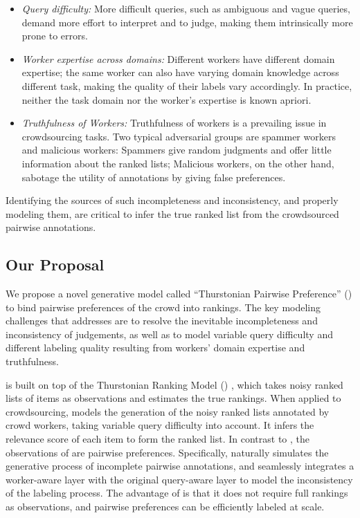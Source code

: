 \begin{itemize}
  \item \emph{Query difficulty:}  More difficult queries, such as ambiguous and
    vague queries, demand more effort to interpret and to judge, making them
    intrinsically more prone to errors.
  \item  {\emph{Worker expertise across domains:}} Different workers have
    different domain expertise; the same worker can also have varying domain
    knowledge across different task, making the quality of their labels vary
    accordingly. In practice, neither the task domain nor the worker's expertise
    is known apriori.
  \item {\emph{Truthfulness of Workers:}} Truthfulness of workers is a prevailing
    issue in crowdsourcing tasks. Two typical adversarial groups are spammer
    workers and malicious workers: Spammers give random judgments and offer little
    information about the ranked lists;  Malicious workers, on the other hand,
    sabotage the utility of annotations by giving false preferences.
\end{itemize}

Identifying the sources of such incompleteness and inconsistency, and properly
modeling them, are critical to infer the true ranked list from the crowdsourced
pairwise annotations.

\subsection{Our Proposal}

We propose a novel generative model called ``Thurstonian Pairwise Preference''
(\tpp{}) to bind pairwise preferences of the crowd into rankings.  The key
modeling challenges that \tpp{} addresses are to resolve the inevitable
incompleteness and inconsistency of judgements, as well as to model variable
query difficulty and different labeling quality resulting from workers' domain
expertise and truthfulness.

\tpp{} is built on top of the Thurstonian Ranking Model (\trm{})
\cite{thurstone1927law}, which takes noisy ranked lists of items as observations
and estimates the true rankings. When applied to crowdsourcing, \trm{} models
the generation of the noisy ranked lists annotated by crowd workers, taking
variable query difficulty into account. It infers the relevance score of each
item to form the ranked list. In contrast to \trm{}, the observations of \tpp{}
are pairwise preferences.  Specifically, \tpp{} naturally simulates the
generative process of incomplete pairwise annotations, and seamlessly integrates
a worker-aware layer with the original query-aware layer to model the
inconsistency of the labeling process.  The advantage of \tpp{} is that it does
not require full rankings as observations, and pairwise preferences can be
efficiently labeled at scale.

